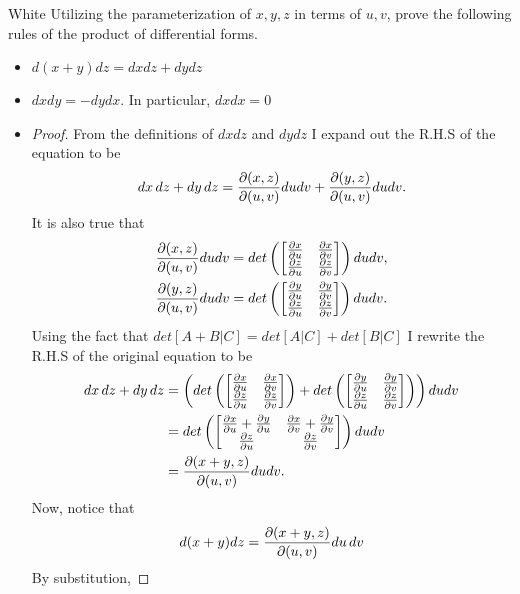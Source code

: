 \documentclass[titlepage]{article}
\begin{document}
\fancyhf{}
\cfoot{\thepage}

\begin{cproblem}{1}{White}
Utilizing the parameterization of $x,y,z$ in terms of $u,v$, prove the following rules of the product of differential forms.
\begin{itemize}
\item[1.] $d(x+y)dz = dxdz + dydz$
\item[2.] $dxdy = -dydx$. In particular, $dxdx=0$
\end{itemize}
\end{cproblem}
\begin{solution}
\vspace{-2em}
\begin{itemize}
\item[1.]
\begin{proof}
 From the definitions of $dxdz$ and $dydz$ I expand out the R.H.S of the equation to be 
$$dx\,dz + dy\,dz = \frac{\partial(x,z)}{\partial(u,v)}dudv  + \frac{\partial (y,z)}{\partial (u,v)}dudv.$$
It is also true that 
\begin{align*}
\frac{\p (x,z)}{\p (u,v)}dudv &= det\left(\bmat{\frac{\p x}{\p u} & \frac{\p x}{\p v} \\ \frac{\p z}{\p u} & \frac{\p z}{ \p v}}\right)dudv, \\
\frac{\p (y,z)}{\p (u,v)}dudv & =det\left(\bmat{\frac{\p y}{\p u} & \frac{\p y}{\p v} \\ \frac{\p z}{\p u} & \frac{\p z}{ \p v}}\right)dudv .
\end{align*}
Using the fact that $det[A+B|C] = det[A|C]+det[B|C]$ I rewrite the R.H.S of the original equation to be
\begin{align*}dx\,dz + dy\,dz &=\left( det\left(\bmat{\frac{\p x}{\p u} & \frac{\p x}{\p v} \\ \frac{\p z}{\p u} & \frac{\p z}{ \p v}}\right) + det\left(\bmat{\frac{\p y}{\p u} & \frac{\p y}{\p v} \\ \frac{\p z}{\p u} & \frac{\p z}{ \p v}}\right)\right)dudv\\
 &= det\left(\bmat{\frac{\p x}{\p u} + \frac{\p y}{\p u} & \frac{\p x}{\p v} + \frac{\p y}{\p v} \\ \frac{\p z}{\p u} & \frac{\p z}{ \p v}}\right)dudv\\
  &= \frac{\p(x+y,z)}{\p (u,v)}dudv.
\end{align*}
Now, notice that 
$$d(x+y)dz = \frac{\partial (x + y,z)}{\partial (u,v)}du\,dv$$
By substitution,

\end{proof}
\end{itemize}
\end{solution}
\end{document}
